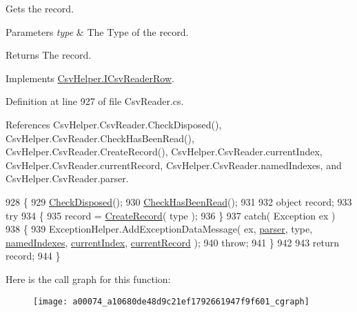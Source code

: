 Gets the record. 


\begin{DoxyParams}{Parameters}
{\em type} & The Type of the record.\\
\hline
\end{DoxyParams}
\begin{DoxyReturn}{Returns}
The record.
\end{DoxyReturn}


Implements \hyperlink{a00110_a911748932ed897a2e7086c0c49bdceea}{Csv\-Helper.\-I\-Csv\-Reader\-Row}.



Definition at line 927 of file Csv\-Reader.\-cs.



References Csv\-Helper.\-Csv\-Reader.\-Check\-Disposed(), Csv\-Helper.\-Csv\-Reader.\-Check\-Has\-Been\-Read(), Csv\-Helper.\-Csv\-Reader.\-Create\-Record(), Csv\-Helper.\-Csv\-Reader.\-current\-Index, Csv\-Helper.\-Csv\-Reader.\-current\-Record, Csv\-Helper.\-Csv\-Reader.\-named\-Indexes, and Csv\-Helper.\-Csv\-Reader.\-parser.


\begin{DoxyCode}
928         \{
929             \hyperlink{a00074_a6fa45a46ed1322dc1872ca2321b5edbc}{CheckDisposed}();
930             \hyperlink{a00074_a2d9249171ed1568e45d152766d364c31}{CheckHasBeenRead}();
931 
932             \textcolor{keywordtype}{object} record;
933             \textcolor{keywordflow}{try}
934             \{
935                 record = \hyperlink{a00074_a722545ede4e575795ee9a73f6ada0ac7}{CreateRecord}( type );
936             \}
937             \textcolor{keywordflow}{catch}( Exception ex )
938             \{
939                 ExceptionHelper.AddExceptionDataMessage( ex, \hyperlink{a00074_aaf2ee64c7a157027aea69bfae1fa9edc}{parser}, type, 
      \hyperlink{a00074_a3114f49bd2b3c4966f4b15a310747aeb}{namedIndexes}, \hyperlink{a00074_a56e974bc7e2242912e956393e831e166}{currentIndex}, \hyperlink{a00074_ab2bfef15784add66e441c9d3a0d73751}{currentRecord} );
940                 \textcolor{keywordflow}{throw};
941             \}
942 
943             \textcolor{keywordflow}{return} record;
944         \}
\end{DoxyCode}


Here is the call graph for this function\-:
\nopagebreak
\begin{figure}[H]
\begin{center}
\leavevmode
\texttt{[image: a00074\_a10680de48d9c21ef1792661947f9f601\_cgraph]}
\end{center}
\end{figure}


